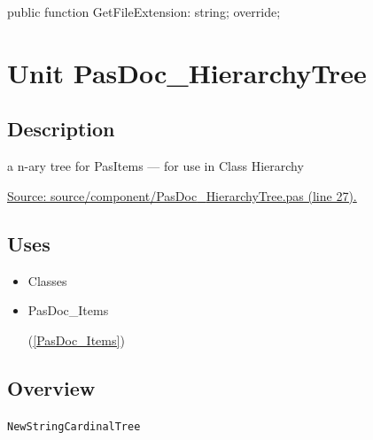 \documentclass{report}
\newif\ifpdf
\begin{document}
\label{PasDoc_GenSimpleXML.TSimpleXMLDocGenerator-GetFileExtension}
\begin{list}{}{
\setlength{\itemindent}{0cm}
\setlength{\listparindent}{0cm}
\setlength{\leftmargin}{\evensidemargin}
\addtolength{\leftmargin}{\tmplength}
\settowidth{\labelsep}{X}
\addtolength{\leftmargin}{\labelsep}
\setlength{\labelwidth}{\tmplength}
}
\item[\textbf{Declaration}\hfill]
\ifpdf
\begin{flushleft}
\fi
\begin{ttfamily}
public function GetFileExtension: string; override;\end{ttfamily}

\ifpdf
\end{flushleft}
\fi

\end{list}
\chapter{Unit PasDoc{\_}HierarchyTree}
\label{PasDoc_HierarchyTree}
\section{Description}
 a n{-}ary tree for PasItems --- for use in Class Hierarchy\par
\href{https://github.com/pasdoc/pasdoc/blob/master/source/component/PasDoc_HierarchyTree.pas#L27}{Source: source/component/PasDoc{\_}HierarchyTree.pas (line 27).}
\section{Uses}
\begin{itemize}
\item \begin{ttfamily}Classes\end{ttfamily}\item \begin{ttfamily}PasDoc{\_}Items\end{ttfamily}(\ref{PasDoc_Items})\end{itemize}
\section{Overview}
\begin{description}
\item[\texttt{\begin{ttfamily}TPasItemNode\end{ttfamily} Class}]
\item[\texttt{\begin{ttfamily}TStringCardinalTree\end{ttfamily} Class}]
\end{description}
\begin{description}
\item[\texttt{NewStringCardinalTree}]
\end{description}
\end{document}

